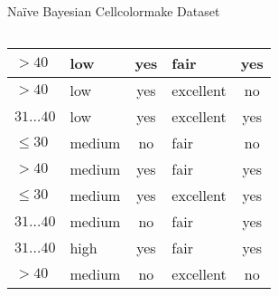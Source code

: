 \begin{frame}{Naïve Bayesian Cellcolormake Dataset}
\begin{columns}
\begin{column}{0.6\textwidth}
{\begin{tabular}{|l|l|c|l|c|}
					\cellcolor{yellow!20}$>40$        & \cellcolor{yellow!20}low    & \cellcolor{yellow!20}yes   & \cellcolor{yellow!20}fair         & \cellcolor{green!20}yes            \\\hline
					\cellcolor{yellow!20}$>40$        & \cellcolor{yellow!20}low    & \cellcolor{yellow!20}yes   & \cellcolor{yellow!20}excellent    & \cellcolor{red!20}no               \\\hline
					\cellcolor{yellow!20}$31\ldots40$ & \cellcolor{yellow!20}low    & \cellcolor{yellow!20}yes   & \cellcolor{yellow!20}excellent    & \cellcolor{green!20}yes            \\\hline
					\cellcolor{yellow!20}$\leq30$     & \cellcolor{yellow!20}medium & \cellcolor{yellow!20}no    & \cellcolor{yellow!20}fair         & \cellcolor{red!20}no               \\\hline
					\cellcolor{yellow!20}$>40$        & \cellcolor{yellow!20}medium & \cellcolor{yellow!20}yes   & \cellcolor{yellow!20}fair         & \cellcolor{green!20}yes            \\\hline
					\cellcolor{yellow!20}$\leq30$     & \cellcolor{yellow!20}medium & \cellcolor{yellow!20}yes   & \cellcolor{yellow!20}excellent    & \cellcolor{green!20}yes            \\\hline
					\cellcolor{yellow!20}$31\ldots40$ & \cellcolor{yellow!20}medium & \cellcolor{yellow!20}no    & \cellcolor{yellow!20}fair         & \cellcolor{green!20}yes            \\\hline
					\cellcolor{yellow!20}$31\ldots40$ & \cellcolor{yellow!20}high   & \cellcolor{yellow!20}yes   & \cellcolor{yellow!20}fair         & \cellcolor{green!20}yes            \\\hline
					\cellcolor{yellow!20}$>40$        & \cellcolor{yellow!20}medium & \cellcolor{yellow!20}no    & \cellcolor{yellow!20}excellent    & \cellcolor{red!20}no               \\\hline
				\end{tabular}}
		\end{column}
	\end{columns}
\end{frame}

